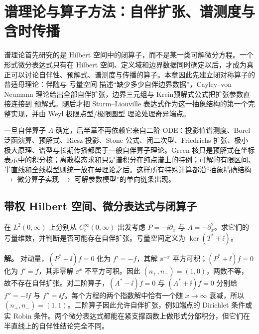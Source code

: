 \chapter{谱理论与算子方法：自伴扩张、谱测度与含时传播} \label{chap:math-unbounded} \label{chap:math-spectrum}
\label{chap:ghs-self-adjoint-spectra}
\label{chap:ghs-spectral-foundations}
\label{chap:ghs-r6-continuous-spectrum}

谱理论首先研究的是 Hilbert 空间中的闭算子，而不是某一类可解微分方程。一个形式微分表达式只有在 Hilbert 空间、定义域和边界数据同时确定以后，才成为真正可以讨论自伴性、预解式、谱测度与传播的算子。本章因此先建立闭对称算子的普适母理论：伴随与 亏量空间 描述“缺少多少自伴边界数据”，Cayley--von Neumann 理论给出全部自伴扩张，边界三元组与 Krein预解式公式把扩张参数直接连接到 预解式。随后才把 Sturm--Liouville 表达式作为这一抽象结构的第一个完整实现，并由 Weyl 极限点型/极限圆型 理论处理奇异端点。

一旦自伴算子 $A$ 确定，后半章不再依赖它来自二阶 ODE：投影值谱测度、Borel 泛函演算、预解式、Riesz 投影、Stone 公式、闭二次型、Friedrichs 扩张、极小极大原理、谱型与长期传播都属于一般自伴算子理论。Green 核只是预解式在坐标表示中的积分核；离散模态求和只是谱积分在纯点谱上的特例；可解的有限区间、半直线和全线模型则统一放在母理论之后。这样所有特殊计算都沿“抽象精确结构 $\to$ 微分算子实现 $\to$ 可解参数模型”的单向链条出现。



\section{带权 Hilbert 空间、微分表达式与闭算子}

\begin{workedexample}[半直线动量与二阶算子的亏量]
在 \(L^2(0,\infty)\) 上分别从 \(C_c^\infty(0,\infty)\) 出发考虑 \(P=-\ii\partial_x\) 与 \(A=-\partial_x^2\)。求它们的亏量维数，并判断是否可能存在自伴扩张。亏量空间定义为 \(\ker(T^*\mp\ii)\)。

\textbf{解。} 对动量，\((P^*-\ii)f=0\) 化为 \(f'=-f\)，其解 \(\ee^{-x}\) 平方可积；\((P^*+\ii)f=0\) 化为 \(f'=f\)，其非零解 \(\ee^x\) 不平方可积。因此 \((n_+,n_-)=(1,0)\)，两数不等，故不存在自伴扩张。对二阶算子，\((A^*-\ii)f=0\) 与 \((A^*+\ii)f=0\) 分别给 \(f''=-\ii f\) 与 \(f''=\ii f\)。每个方程的两个指数解中恰有一个随 \(x\to\infty\) 衰减，所以 \((n_+,n_-)=(1,1)\)。二阶算子因此允许自伴扩张，例如端点的 Dirichlet 条件或实 Robin 条件。两个微分表达式都能在紧支撑函数上做形式分部积分，但它们在半直线上的自伴性结论完全不同。

\end{workedexample}

